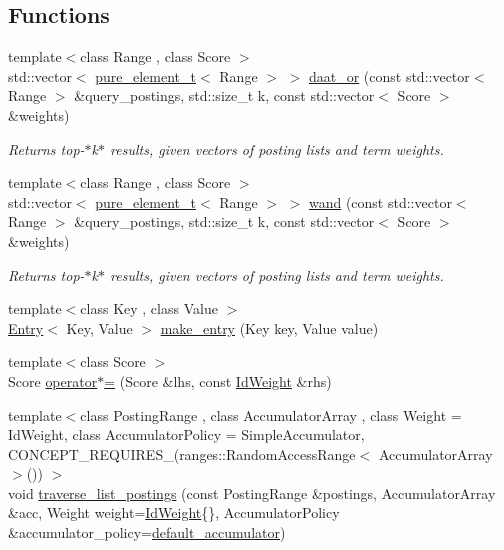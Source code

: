 \subsection*{Functions}
\begin{DoxyCompactItemize}
\item 
{\footnotesize template$<$class Range , class Score $>$ }\\std\+::vector$<$ \hyperlink{namespaceirkit_afcffab67300c5c703cb38a363c9a6f1d}{pure\+\_\+element\+\_\+t}$<$ Range $>$ $>$ \hyperlink{namespaceirkit_ad6a1763616725ecb88e751ea7eb93453}{daat\+\_\+or} (const std\+::vector$<$ Range $>$ \&query\+\_\+postings, std\+::size\+\_\+t k, const std\+::vector$<$ Score $>$ \&weights)
\begin{DoxyCompactList}\small\item\em Returns top-\/$\ast$k$\ast$ results, given vectors of posting lists and term weights. \end{DoxyCompactList}\item 
{\footnotesize template$<$class Range , class Score $>$ }\\std\+::vector$<$ \hyperlink{namespaceirkit_afcffab67300c5c703cb38a363c9a6f1d}{pure\+\_\+element\+\_\+t}$<$ Range $>$ $>$ \hyperlink{namespaceirkit_aea02f4f5f20e40308d5f07ce72d79d60}{wand} (const std\+::vector$<$ Range $>$ \&query\+\_\+postings, std\+::size\+\_\+t k, const std\+::vector$<$ Score $>$ \&weights)
\begin{DoxyCompactList}\small\item\em Returns top-\/$\ast$k$\ast$ results, given vectors of posting lists and term weights. \end{DoxyCompactList}\item 
{\footnotesize template$<$class Key , class Value $>$ }\\\hyperlink{structirkit_1_1Entry}{Entry}$<$ Key, Value $>$ \hyperlink{namespaceirkit_abc73938eba85366a0aa6662dc60b6bb2}{make\+\_\+entry} (Key key, Value value)
\item 
{\footnotesize template$<$class Score $>$ }\\Score \hyperlink{namespaceirkit_a99480163d943f35b7e1763c161d0fab6}{operator$\ast$=} (Score \&lhs, const \hyperlink{structirkit_1_1IdWeight}{Id\+Weight} \&rhs)
\item 
{\footnotesize template$<$class Posting\+Range , class Accumulator\+Array , class Weight  = Id\+Weight, class Accumulator\+Policy  = Simple\+Accumulator, C\+O\+N\+C\+E\+P\+T\+\_\+\+R\+E\+Q\+U\+I\+R\+E\+S\+\_\+(ranges\+::\+Random\+Access\+Range$<$ Accumulator\+Array $>$()) $>$ }\\void \hyperlink{namespaceirkit_ad498b50414a2c4e8d90325839219f8eb}{traverse\+\_\+list\+\_\+postings} (const Posting\+Range \&postings, Accumulator\+Array \&acc, Weight weight=\hyperlink{structirkit_1_1IdWeight}{Id\+Weight}\{\}, Accumulator\+Policy \&accumulator\+\_\+policy=\hyperlink{namespaceirkit_a823671564bf545991e9708011e4a8df1}{default\+\_\+accumulator})

\end{DoxyCompactItemize}
